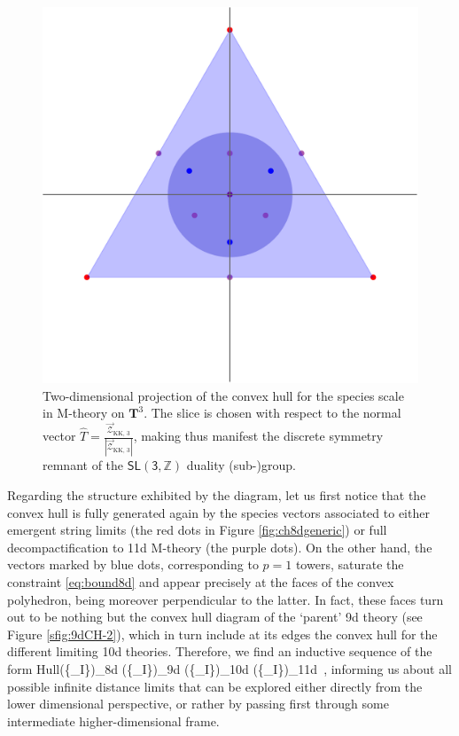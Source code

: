 \begin{figure}[htb]
\begin{center}
\includegraphics[scale=.4]{CH-T3-projected-2.pdf}
\caption{\small Two-dimensional projection of the convex hull for the species scale in M-theory on $\mathbf{T}^3$. The slice is chosen with respect to the normal vector $\hat T = \frac{\vec{\mathcal{Z}}_{\text{KK},\, 3}}{|\vec{\mathcal{Z}}_{\text{KK},\, 3}|}$, making thus manifest the discrete symmetry remnant of the $\mathsf{SL(3, \mathbb{Z})}$ duality (sub-)group.} 
 \label{fig:ch8dSL3}
 \end{center}
 \end{figure}

Regarding the structure exhibited by the diagram, let us first notice that the convex hull is fully generated again by the species vectors associated to either emergent string limits (the red dots in Figure \ref{fig:ch8dgeneric}) or full decompactification to 11d M-theory (the purple dots). On the other hand, the vectors marked by blue dots, corresponding to $p=1$ towers, saturate the constraint \eqref{eq:bound8d} and appear precisely at the faces of the convex polyhedron, being moreover perpendicular to the latter. In fact, these faces turn out to be nothing but the convex hull diagram of the `parent' 9d theory (see Figure \ref{sfig:9dCH-2}), which in turn include at its edges the convex hull for the different limiting 10d theories. Therefore, we find an inductive sequence of the form
%
\beq
    {\rm Hull}\left(\{_I\}\right)\big\rvert_{\rm 8d} \left(\{_I\}\right)\big\rvert_{\rm 9d} \left(\{_I\}\right)\big\rvert_{\rm 10d} \left(\{_I\}\right)\big\rvert_{\rm 11d}\, ,
\eeq
%
informing us about all possible infinite distance limits that can be explored either directly from the lower dimensional perspective, or rather by passing first through some intermediate higher-dimensional frame.  

